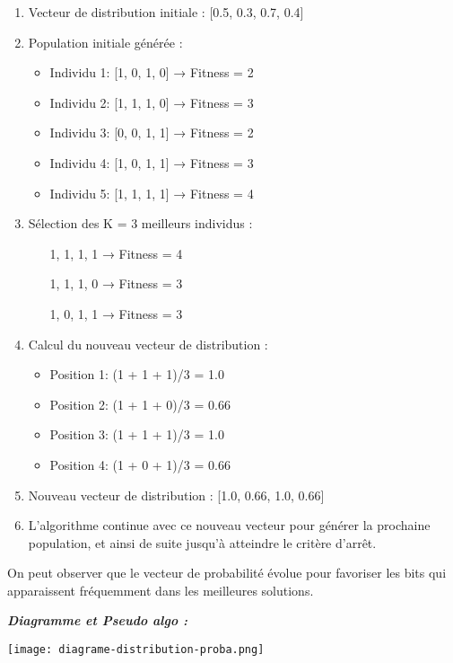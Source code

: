 \documentclass{article}
\begin{document}
\begin{enumerate}
\item Vecteur de distribution initiale : [0.5, 0.3, 0.7, 0.4]

\item Population initiale générée :
    \begin{itemize}
    \item Individu 1: [1, 0, 1, 0] → Fitness = 2
    \item Individu 2: [1, 1, 1, 0] → Fitness = 3
    \item Individu 3: [0, 0, 1, 1] → Fitness = 2
    \item Individu 4: [1, 0, 1, 1] → Fitness = 3
    \item Individu 5: [1, 1, 1, 1] → Fitness = 4
    \end{itemize}

\item Sélection des K = 3 meilleurs individus :
    \begin{itemize}
    \item [1, 1, 1, 1] → Fitness = 4
    \item [1, 1, 1, 0] → Fitness = 3
    \item [1, 0, 1, 1] → Fitness = 3
    \end{itemize}

\item Calcul du nouveau vecteur de distribution :
    \begin{itemize}
    \item Position 1: (1 + 1 + 1)/3 = 1.0
    \item Position 2: (1 + 1 + 0)/3 = 0.66
    \item Position 3: (1 + 1 + 1)/3 = 1.0
    \item Position 4: (1 + 0 + 1)/3 = 0.66
    \end{itemize}

\item Nouveau vecteur de distribution : [1.0, 0.66, 1.0, 0.66]

\item L'algorithme continue avec ce nouveau vecteur pour générer la prochaine population, et ainsi de suite jusqu'à atteindre le critère d'arrêt.
\end{enumerate}
On peut observer que le vecteur de probabilité évolue pour favoriser les bits qui apparaissent fréquemment dans les meilleures solutions.

\textbf{\textit{Diagramme et Pseudo algo :}}

\texttt{[image: diagrame-distribution-proba.png]}
\end{document}
